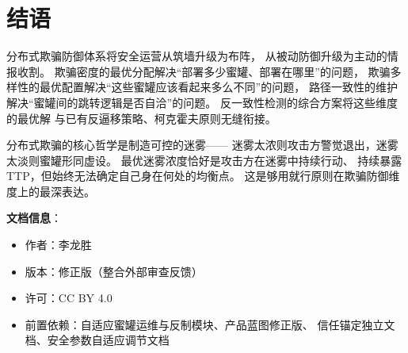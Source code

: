\documentclass[11pt,a4paper]{article}
\begin{document}
\section{结语}

分布式欺骗防御体系将安全运营从筑墙升级为布阵，
从被动防御升级为主动的情报收割。
欺骗密度的最优分配解决“部署多少蜜罐、部署在哪里”的问题，
欺骗多样性的最优配置解决“这些蜜罐应该看起来多么不同”的问题，
路径一致性的维护解决“蜜罐间的跳转逻辑是否自洽”的问题。
反一致性检测的综合方案将这些维度的最优解
与已有反逼移策略、柯克霍夫原则无缝衔接。

分布式欺骗的核心哲学是制造可控的迷雾——
迷雾太浓则攻击方警觉退出，迷雾太淡则蜜罐形同虚设。
最优迷雾浓度恰好是攻击方在迷雾中持续行动、
持续暴露TTP，但始终无法确定自己身在何处的均衡点。
这是够用就行原则在欺骗防御维度上的最深表达。

\vspace{5mm}
\noindent\textbf{文档信息}：
\begin{itemize}
    \item 作者：李龙胜
    \item 版本：修正版（整合外部审查反馈）
    \item 许可：CC BY 4.0
    \item 前置依赖：自适应蜜罐运维与反制模块、产品蓝图修正版、
          信任锚定独立文档、安全参数自适应调节文档
\end{itemize}
\end{document}
